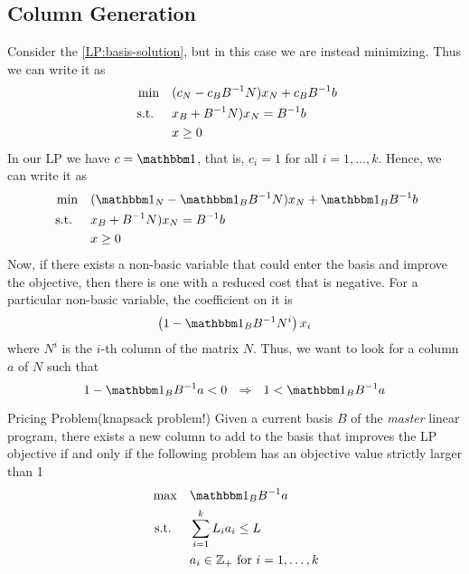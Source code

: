 \documentclass[../open-optimization/open-optimization.tex]{subfiles}
\begin{document}
% 



\subsection{Column Generation}
Consider the \eqref{LP:basis-solution}, but in this case we are instead minimizing.  Thus we can write it as 
 \begin{equation}
 \label{LP:basis-solution2}
\begin{split}
\min \quad & (c_N  - c_B B^{-1} N) x_N + c_B B^{-1} b  \\
\text{ s.t. }  \quad &x_B +  B^{-1} N) x_N = B^{-1}b\\
& x \geq 0
\end{split}
\end{equation}
In our LP we have $c = \one$, that is, $c_i =1$ for all $i=1, \dots, k$.  Hence, we can write it as 
 \begin{equation}
 \label{LP:basis-solution3}
\begin{split}
\min \quad & (\one_N  - \one_B B^{-1} N) x_N + \one_B B^{-1} b  \\
\st  \quad &x_B +  B^{-1} N) x_N = B^{-1}b\\
& x \geq 0
\end{split}
\end{equation}
Now, if there exists a non-basic variable that could enter the basis and improve the objective, then there is one with a reduced cost that is negative.  For a particular non-basic variable, the coefficient on it is
\begin{equation}
\left( 1 -  \one_B B^{-1} N^i\right) x_i
\end{equation}
where $N^i$ is the $i$-th column of the matrix $N$.  Thus, we want to look for a column $a$ of $N$ such that 
\begin{equation}
1 -  \one_B B^{-1} a < 0 \ \  \Rightarrow \ \   1 < \one_B B^{-1} a
\end{equation}
\begin{general}{Pricing Problem}{(knapsack problem!)}
Given a current basis $B$ of the \emph{master} linear program, there exists a new column to add to the basis that improves the LP objective if and only if the following problem has an objective value strictly larger than 1
\begin{equation}
\begin{split}
\max\quad  &\one_B B^{-1} a\\
\st \quad & \sum_{i=1}^k L_i a_i \leq L\\
& a_i \in \Z_+ \text{ for } i=1, \dots, k
\end{split}
\end{equation}
\end{general}
\end{document}
